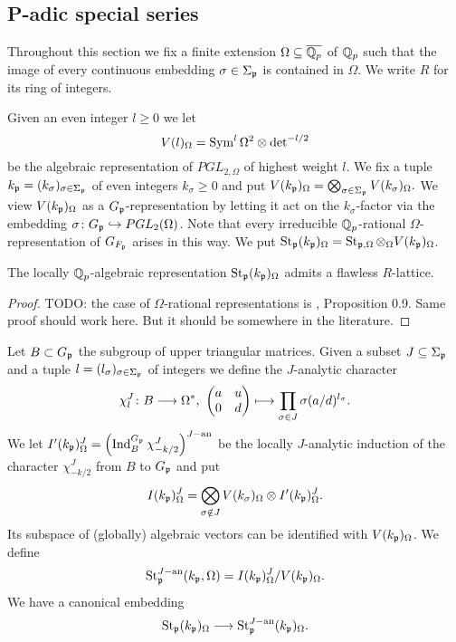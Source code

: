 \subsection{P-adic special series}\label{Steinberg}
Throughout this section we fix a finite extension $\Omega\subseteq \overline{\mathbb{Q}_p}$ of $\mathbb{Q}_p$ such that the image of every continuous embedding $\sigma\in\Sigma_{\mathfrak{p}}$ is contained in $\Omega$.
We write $R$ for its ring of integers.

Given an even integer $l\geq 0$ we let
$$V(l)_{\Omega}=\operatorname{Sym}^{l}\Omega^{2}\otimes \operatorname{det}^{-l/2}$$
be the algebraic representation of $PGL_{2,\Omega}$ of highest weight $l$.
We fix a tuple $k_{\mathfrak{p}}=(k_\sigma)_{\sigma\in\Sigma_{\mathfrak{p}}}$ of even integers $k_\sigma\geq 0$ and put
$V(k_{\mathfrak{p}})_{\Omega}=\bigotimes_{\sigma\in\Sigma_{\mathfrak{p}}}V(k_\sigma)_\Omega.$
We view $V(k_{\mathfrak{p}})_\Omega$ as a $G_{\mathfrak{p}}$-representation by letting it act on the $k_\sigma$-factor via the embedding $\sigma \colon G_{\mathfrak{p}}\hookrightarrow PGL_2(\Omega)$.
Note that every irreducible $\mathbb{Q}_p$-rational $\Omega$-representation of $G_{F_{\mathfrak{p}}}$ arises in this way.
We put $\operatorname{St}_{\mathfrak{p}}(k_{\mathfrak{p}})_\Omega=\operatorname{St}_{\mathfrak{p},\Omega}\otimes_{\Omega}V(k_{\mathfrak{p}})_\Omega$.
\begin{Pro}\label{flawlessSteinberg}
The locally $\mathbb{Q}_p$-algebraic representation $\operatorname{St}_{\mathfrak{p}}(k_{\mathfrak{p}})_\Omega$ admits a flawless $R$-lattice.
\end{Pro}
\begin{proof}
TODO: the case of $\Omega$-rational representations is \cite{Vi}, Proposition 0.9.
Same proof should work here.
But it should be somewhere in the literature.
\end{proof}

Let $B\subset G_{\mathfrak{p}}$ the subgroup of upper triangular matrices.
Given a subset $J\subseteq \Sigma_{\mathfrak{p}}$ and a tuple $l=(l_\sigma)_{\sigma\in \Sigma_{\mathfrak{p}}}$ of integers we define the $J$-analytic character
$$\chi^J_{l}\colon B\longrightarrow \Omega^{\ast},\ \begin{pmatrix} a & u \\ 0 & d \end{pmatrix} \longmapsto \prod_{\sigma\in J}\sigma(a/d)^{l_\sigma}.$$
We let $I^\prime(k_{\mathfrak{p}})^J_\Omega=\left(\operatorname{Ind}_{B}^{G_{\mathfrak{p}}}\chi^J_{-k/2}\right)^{J-\operatorname{an}}$ be the locally $J$-analytic induction of the character $\chi^J_{-k/2}$ from $B$ to $G_{\mathfrak{p}}$ and put
$$I(k_{\mathfrak{p}})^J_\Omega=\bigotimes_{\sigma\notin J}V(k_\sigma)_\Omega  \otimes I^\prime(k_{\mathfrak{p}})^J_\Omega.$$
Its subspace of (globally) algebraic vectors can be identified with $V(k_{\mathfrak{p}})_\Omega$.
We define
$$\operatorname{St}^{J-\operatorname{an}}_{\mathfrak{p}}(k_{\mathfrak{p}} ,\Omega)=I(k_{\mathfrak{p}})^{J}_{\Omega}/V(k_{\mathfrak{p}})_\Omega.$$
We have a canonical embedding
$$\operatorname{St}_{\mathfrak{p}}(k_{\mathfrak{p}})_\Omega\longrightarrow \operatorname{St}_{\mathfrak{p}}^{J-\operatorname{an}}(k_{\mathfrak{p}})_\Omega.$$

